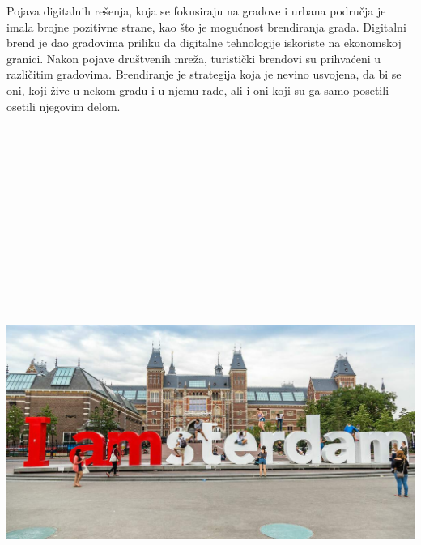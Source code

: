 \documentclass[a0,portrait]{a0poster}
\begin{document}
\begin{multicols}{2}
\Large{
Pojava digitalnih rešenja, koja se fokusiraju na gradove i urbana područja je imala brojne pozitivne strane, kao što je mogućnost brendiranja grada. Digitalni brend je dao gradovima priliku da digitalne tehnologije iskoriste na ekonomskoj granici. Nakon pojave društvenih mreža, turistički brendovi su prihvaćeni u različitim gradovima. Brendiranje je strategija koja je nevino usvojena, da bi se oni, koji žive u nekom gradu i u njemu rade, ali i oni koji su ga samo posetili osetili njegovim delom.
}

\begin{center}\vspace{1cm}
\includegraphics[width=30cm,height=20cm]{rijksmuseum-amsterdam-museum-iamsterdam.jpg}
\end{center}\vspace{1cm}


\end{multicols}
\end{document}

